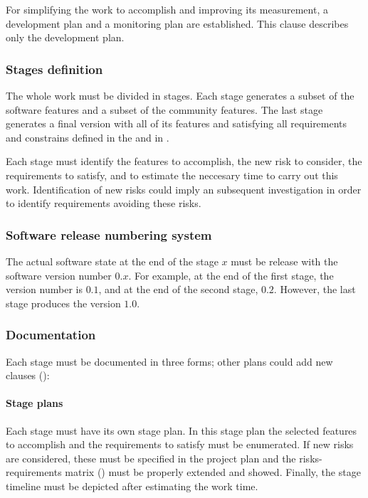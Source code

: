 \documentclass[twocolumn]{article}
\begin{document}
For simplifying the work to accomplish and improving its measurement,
a development plan and a monitoring plan are established. This clause
describes only the development plan.

\subsubsection{Stages definition}
\label{sssec:stages-definition}
The whole work must be divided in stages. Each stage generates a
subset of the \fav software features and a subset of the \fav
community features. The last stage generates a final version with all
of its features and satisfying all requirements and constrains defined
in the \favc and in .

Each stage must identify the features to accomplish, the new risk to
consider, the requirements to satisfy, and to estimate the neccesary
time to carry out this work. Identification of new risks could imply
an subsequent investigation in order to identify requirements avoiding
these risks.

\subsubsection{Software release numbering system}
\label{sssec:release}
The actual software state at the end of the stage $x$ must be release
with the software version number $0.x$. For example, at the end of the first
stage, the version number is $0.1$, and at the end of the second
stage, $0.2$. However, the last stage produces the \fav version
$1.0$.

\subsubsection{Documentation}
Each stage must be documented in three forms; other plans could add new
clauses
():

\paragraph{Stage plans}
Each stage must have its own stage plan. In this stage plan the
selected features to accomplish and the requirements to satisfy must
be enumerated. If new risks are considered, these must be specified in
the project plan and the risks-requirements matrix
() must be properly extended and
showed. Finally, the stage timeline must be depicted after estimating
the work time.
\end{document}

